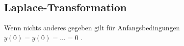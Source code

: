 \subsection{Laplace-Transformation}
Wenn nichts anderes gegeben gilt für Anfangsbedingungen $y(0) = \dot{y(0)} =  \ldots = 0$ .
